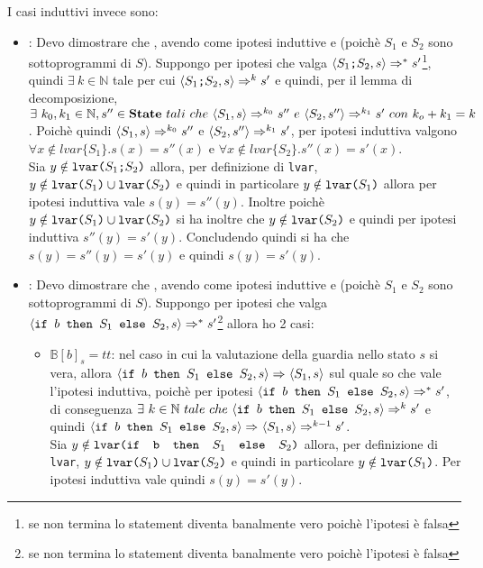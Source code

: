 {	I casi induttivi invece sono:
	\begin{itemize}
	\item {}: Devo dimostrare che 
	, avendo come ipotesi induttive
	 e  (poichè $S_1$ e $S_2$ sono sottoprogrammi di
	$S$). Suppongo per ipotesi che valga
	$\confSs{\concat{$S_1$}{$S_2$}}{s}\Rar{*}s'$\footnote{se non termina lo
	statement diventa banalmente vero poichè l'ipotesi è falsa}, quindi
	$\exists{}~k\in\mathbb{N}$ tale per cui 
	$\confSs{\concat{$S_1$}{$S_2$}}{s}\Rar{k}s'$ e quindi, per il lemma di
	decomposizione, $\exists{}~k_0, k_1\in\mathbb{N},s''\in\states~tali~che~
	\confSs{S_1}{s}\Rar{k_0}s''~e~\confSs{S_2}{s''}\Rar{k_1}s'~con~k_o+k_1=k$.
	Poichè quindi $\confSs{S_1}{s}\Rar{k_0}s''$ e 
	$\confSs{S_2}{s''}\Rar{k_1}s'$, per ipotesi induttiva valgono
	$\forall{} x \notin lvar\{S_1\}.s(x)=s''(x)$ e 
	$\forall{} x \notin lvar\{S_2\}.s''(x)=s'(x)$. \\
	Sia $y\notin\lvar{\concat{$S_1$}{$S_2$}}$ allora, per definizione di 
	\texttt{lvar}, $y\notin\lvar{$S_1$} \cup \lvar{$S_2$}$ e quindi in
	particolare $y\notin\lvar{$S_1$}$ allora per ipotesi induttiva vale
	$s(y)=s''(y)$. Inoltre poichè $y\notin\lvar{$S_1$} \cup \lvar{$S_2$}$ si ha
	inoltre che $y\notin\lvar{$S_2$}$ e quindi per ipotesi induttiva 
	$s''(y)=s'(y)$. Concludendo quindi si ha che $s(y)=s''(y)=s'(y)$ e quindi
	$s(y)=s'(y)$.

	\item {}: Devo dimostrare che
	, avendo come ipotesi induttive
	 e  (poichè $S_1$ e $S_2$ sono sottoprogrammi di
	$S$). Suppongo per ipotesi che valga 
	$\confSs{\ifABC{b}{S_1}{S_2}}{s}\Rar{*}s'$\footnote{se non termina lo
	statement diventa banalmente vero poichè l'ipotesi è falsa} allora ho 2
	casi:
		\begin{itemize}
		\item $\mathbb{B}[b]_s=tt$: nel caso in cui la valutazione della guardia
		nello stato $s$ si vera, allora 
		$\confSs{\ifABC{b}{S_1}{S_2}}{s}\Rar{}\confSs{S_1}{s}$ sul quale so che
		vale l'ipotesi induttiva, poichè per ipotesi 
		$\confSs{\ifABC{b}{S_1}{S_2}}{s}\Rar{*}s'$, di conseguenza $\exists~k\in
		\mathbb{N}~tale~che~\confSs{\ifABC{b}{S_1}{S_2}}{s}\Rar{k}s'$ e quindi 
		$\confSs{\ifABC{b}{S_1}{S_2}}{s}\Rar{}\confSs{S_1}{s}\Rar{k-1}s'$. \\
		Sia $y\notin\lvar{\ifABC{b}{$S_1$}{$S_2$}}$ allora, per definizione di 
		\texttt{lvar}, $y\notin\lvar{$S_1$} \cup \lvar{$S_2$}$ e quindi in
		particolare $y\notin\lvar{$S_1$}$. Per ipotesi induttiva vale quindi
		$s(y)=s'(y)$.


\end{itemize}
\end{itemize}}
